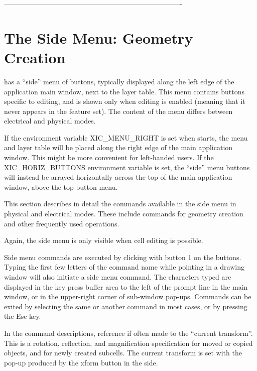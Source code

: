 ----------------------------------------------------------------------------

\chapter{The Side Menu:  Geometry Creation}
\label{sidemenu}

{\Xic} has a ``side'' menu of buttons, typically displayed along the
left edge of the application main window, next to the layer table. 
This menu contains buttons specific to editing, and is shown only when
editing is enabled (meaning that it never appears in the {\Xiv}
feature set).  The content of the menu differs between electrical and
physical modes.

If the environment variable {\et XIC\_MENU\_RIGHT} is set when {\Xic}
starts, the menu and layer table will be placed along the right edge
of the main application window.  This might be more convenient for
left-handed users.  If the {\et XIC\_HORIZ\_BUTTONS} environment
variable is set, the ``side'' menu buttons will instead be arrayed
horizontally across the top of the main application window, above the
top button menu.

This section describes in detail the commands available in the side
menu in physical and electrical modes.  These include commands for
geometry creation and other frequently used operations.

Again, the side menu is only visible when cell editing is possible.

Side menu commands are executed by clicking with button 1 on the
buttons.  Typing the first few letters of the command name while
pointing in a drawing window will also initiate a side menu command. 
The characters typed are displayed in the key press buffer area to the
left of the prompt line in the main window, or in the upper-right
corner of sub-window pop-ups.  Commands can be exited by selecting the
same or another command in most cases, or by pressing the {\kb Esc}
key.

In the command descriptions, reference if often made to the ``current
transform''.  This is a rotation, reflection, and magnification
specification for moved or copied objects, and for newly created
subcells.  The current transform is set with the pop-up produced by
the {\cb xform} button in the side.

